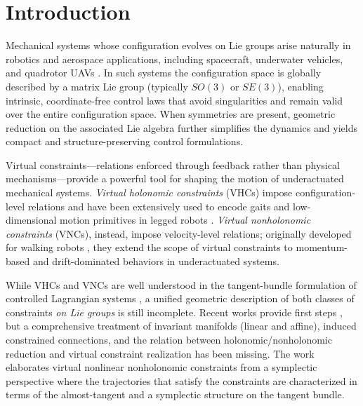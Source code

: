 \documentclass[letterpaper, 10 pt, conference]{ieeeconf}
\begin{document}




\section{Introduction}

Mechanical systems whose configuration evolves on Lie groups arise naturally in robotics and aerospace applications, including spacecraft, underwater vehicles, and quadrotor UAVs \cite{bullo,lee2010geometric}.  
In such systems the configuration space is globally described by a matrix Lie group (typically $SO(3)$ or $SE(3)$), enabling intrinsic, coordinate-free control laws that avoid singularities and remain valid over the entire configuration space.  
When symmetries are present, geometric reduction on the associated Lie algebra further simplifies the dynamics and yields compact and structure-preserving control formulations.

Virtual constraints—relations enforced through feedback rather than physical mechanisms—provide a powerful tool for shaping the motion of underactuated mechanical systems.  
\emph{Virtual holonomic constraints} (VHCs) impose configuration-level relations and have been extensively used to encode gaits and low-dimensional motion primitives in legged robots \cite{chevallereau2009asymptotically,la2013stable,razavi2016symmetric,freidovich2008periodic,westervelt2018feedback}.  
\emph{Virtual nonholonomic constraints} (VNCs), instead, impose velocity-level relations; originally developed for walking robots \cite{griffin2015nonholonomic,griffin2017nonholonomic,horn2018hybrid,horn2020nonholonomic,hamed2019nonholonomic}, they extend the scope of virtual constraints to momentum-based and drift-dominated behaviors in underactuated systems.

While VHCs and VNCs are well understood in the tangent-bundle formulation of controlled Lagrangian systems \cite{isidori,bloch2003nonholonomic}, a unified geometric description of both classes of constraints \emph{on Lie groups} is still incomplete.  
Recent works provide first steps \cite{simoes2023virtual,stratoglou2023virtual,VC,moran2021energy}, but a comprehensive treatment of invariant manifolds (linear and affine), induced constrained connections, and the relation between holonomic/nonholonomic reduction and virtual constraint realization has been missing. The work \cite{stratoglou2026symplectic} elaborates virtual nonlinear nonholonomic constraints from a symplectic perspective where the trajectories that satisfy the constraints are characterized in terms of the almost-tangent and a symplectic structure on the tangent bundle.
\end{document}
